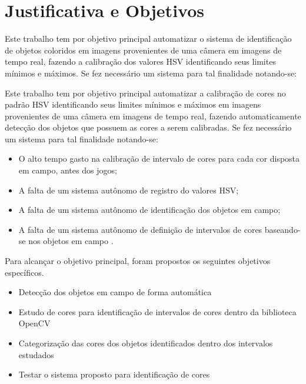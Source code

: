 % 


\section{Justificativa e Objetivos}

Este trabalho tem por objetivo principal automatizar o sistema de identificação de objetos 
coloridos em imagens provenientes de uma câmera em imagens de tempo real, fazendo a calibração dos valores HSV identificando seus limites mínimos e máximos.  
Se fez necessário um sistema para tal finalidade notando-se:


Este trabalho tem por objetivo principal automatizar a calibração de cores no padrão HSV identificando seus limites mínimos e máximos em imagens provenientes de uma câmera em imagens de tempo real, fazendo automaticamente detecção dos objetos que possuem as cores a serem calibradas.
Se fez necessário um sistema para tal finalidade notando-se:


\begin{itemize}
	\item O alto tempo gasto na calibração de intervalo de cores para cada cor disposta em campo, antes dos jogos;
	\item A falta de um sistema autônomo de registro do valores HSV;
	\item A falta de um sistema autônomo de identificação dos objetos em campo;
	\item A falta de um sistema autônomo de definição de intervalos de cores baseando-se nos objetos em campo .
\end{itemize}

Para alcançar o objetivo principal, foram propostos os seguintes objetivos específicos.

\begin{itemize}
	
	\item Detecção dos objetos em campo de forma automática 
	\item Estudo de cores para identificação de intervalos de cores dentro da biblioteca OpenCV
	\item Categorização das cores dos objetos identificados dentro dos intervalos estudados
	\item Testar o sistema proposto para identificação de cores
	
	
\end{itemize}

